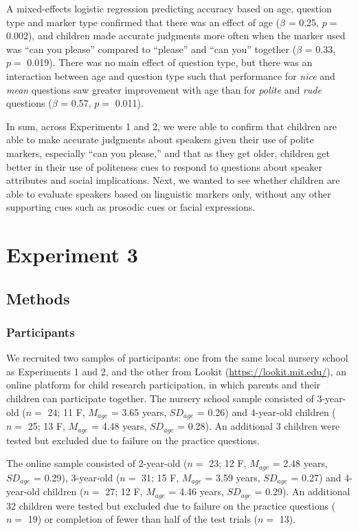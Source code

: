 \documentclass[10pt, letterpaper]{article}
\begin{document}
A mixed-effects logistic regression predicting accuracy based on age,
question type and marker type confirmed that there was an effect of age
(\(\beta\) = 0.25, \(p =\) 0.002), and children made accurate judgments
more often when the marker used was ``can you please'' compared to
``please'' and ``can you'' together (\(\beta\) = 0.33, \(p =\) 0.019).
There was no main effect of question type, but there was an interaction
between age and question type such that performance for \emph{nice} and
\emph{mean} questions saw greater improvement with age than for
\emph{polite} and \emph{rude} questions (\(\beta\) = 0.57, \(p =\)
0.011).

In sum, across Experiments 1 and 2, we were able to confirm that
children are able to make accurate judgments about speakers given their
use of polite markers, especially ``can you please,'' and that as they
get older, children get better in their use of politeness cues to
respond to questions about speaker attributes and social implications.
Next, we wanted to see whether children are able to evaluate speakers
based on linguistic markers only, without any other supporting cues such
as prosodic cues or facial expressions.

\section{Experiment 3}\label{experiment-3}

\subsection{Methods}\label{methods-2}

\subsubsection{Participants}\label{participants-2}

We recruited two samples of participants: one from the same local
nursery school as Experiments 1 and 2, and the other from Lookit
(\url{https://lookit.mit.edu/}), an online platform for child research
participation, in which parents and their children can participate
together. The nursery school sample consisted of 3-year-old (\(n=\) 24;
11 F, \(M_{age}\) = 3.65 years, \(SD_{age}\) = 0.26) and 4-year-old
children (\(n=\) 25; 13 F, \(M_{age}\) = 4.48 years, \(SD_{age}\) =
0.28). An additional 3 children were tested but excluded due to failure
on the practice questions.

The online sample consisted of 2-year-old (\(n=\) 23; 12 F, \(M_{age}\)
= 2.48 years, \(SD_{age}\) = 0.29), 3-year-old (\(n=\) 31; 15 F,
\(M_{age}\) = 3.59 years, \(SD_{age}\) = 0.27) and 4-year-old children
(\(n=\) 27; 12 F, \(M_{age}\) = 4.46 years, \(SD_{age}\) = 0.29). An
additional 32 children were tested but excluded due to failure on the
practice questions (\(n=\) 19) or completion of fewer than half of the
test trials (\(n=\) 13).
\end{document}
